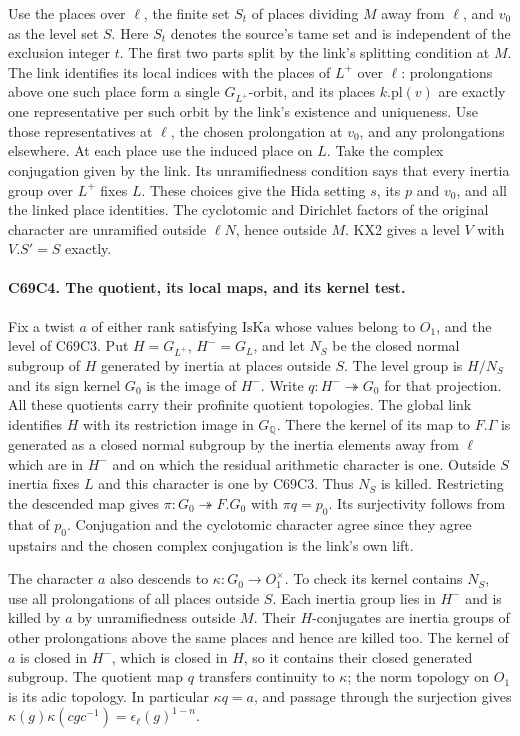 Use the places over $\ell$, the finite set $S_t$ of places dividing
$M$ away from $\ell$, and $v_0$ as the level set $S$. Here $S_t$
denotes the source's tame set and is independent of the exclusion
integer $t$. The first two parts split by the link's splitting
condition at $M$. The link identifies its local indices with the
places of $L^+$ over $\ell$: prolongations above one such place
form a single $G_{L^+}$-orbit, and its places $k.\mathrm{pl}(v)$
are exactly one representative per such orbit by the link's
existence and uniqueness. Use those representatives at $\ell$,
the chosen prolongation at $v_0$, and any prolongations elsewhere.
At each place use the induced place on $L$. Take the complex
conjugation given by the link. Its unramifiedness condition says
that every inertia group over $L^+$ fixes $L$. These choices give
the Hida setting $s$, its $p$ and $v_0$, and all the linked place
identities. The cyclotomic and Dirichlet factors of the original
character are unramified outside $\ell N$, hence outside $M$.
KX2 gives a level $V$ with $V.S'=S$ exactly.

\paragraph{C69C4. The quotient, its local maps, and its kernel test.}
Fix a twist $a$ of either rank satisfying $\mathrm{IsKa}$ whose
values belong to $O_1$, and the level of C69C3. Put $H=G_{L^+}$,
$H^-=G_L$, and let $N_S$ be the closed normal subgroup of $H$
generated by inertia at places outside $S$. The level group is
$H/N_S$ and its sign kernel $G_0$ is the image of $H^-$. Write
$q:H^-\twoheadrightarrow G_0$ for that projection. All these
quotients carry their profinite quotient topologies. The global link
identifies $H$ with its restriction image in $G_{\mathbb Q}$.
There the kernel of its map to $F.\Gamma$ is generated as a closed
normal subgroup by the inertia elements away from $\ell$ which are
in $H^-$ and on which the residual arithmetic character is one.
Outside $S$ inertia fixes $L$ and this character is one by C69C3.
Thus $N_S$ is killed. Restricting the descended map gives
$\pi:G_0\twoheadrightarrow F.G_0$ with $\pi q=p_0$. Its
surjectivity follows from that of $p_0$. Conjugation and the
cyclotomic character agree since they agree upstairs and the chosen
complex conjugation is the link's own lift.

The character $a$ also descends to $\kappa:G_0\to O_1^\times$.
To check its kernel contains $N_S$, use all prolongations of all
places outside $S$. Each inertia group lies in $H^-$ and is killed
by $a$ by unramifiedness outside $M$. Their $H$-conjugates are
inertia groups of other prolongations above the same places and
hence are killed too. The kernel of $a$ is closed in $H^-$,
which is closed in $H$, so it contains their closed generated
subgroup. The quotient map $q$ transfers continuity to $\kappa$;
the norm topology on $O_1$ is its adic topology. In particular
$\kappa q=a$, and passage through the surjection gives
$\kappa(g)\kappa(cgc^{-1})=\epsilon_\ell(g)^{1-n}$.

